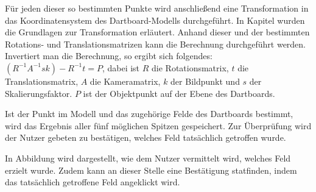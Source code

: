 Für jeden dieser so bestimmten Punkte wird anschließend eine Transformation in das Koordinatensystem des Dartboard-Modells durchgeführt. In Kapitel  wurden die Grundlagen zur Transformation erläutert. Anhand dieser und der bestimmten Rotations- und Translationsmatrizen kann die Berechnung durchgeführt werden. Invertiert man die Berechnung, so ergibt sich folgendes: 
$(R^{-1}A^{-1}sk)-R^{-1}t=P$, dabei ist $R$ die Rotationsmatrix, $t$ die Translationsmatrix, $A$ die Kameramatrix, $k$ der Bildpunkt und $s$ der Skalierungsfaktor. $P$ ist der Objektpunkt auf der Ebene des Dartboards.

Ist der Punkt im Modell und das zugehörige Felde des Dartboards bestimmt, wird das Ergebnis aller fünf möglichen Spitzen gespeichert. Zur Überprüfung wird der Nutzer gebeten zu bestätigen, welches Feld tatsächlich getroffen wurde. 

In Abbildung  wird dargestellt, wie dem Nutzer vermittelt wird, welches Feld erzielt wurde. Zudem kann an dieser Stelle eine Bestätigung statfinden, indem das tatsächlich getroffene Feld angeklickt wird.


